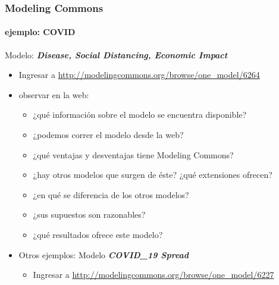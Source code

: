 \documentclass[11pt]{beamer}
\begin{document}
\begin{frame}
	\frametitle{Modeling Commons}
	\framesubtitle{ejemplo: COVID}
Modelo: \textit{\textbf{Disease, Social Distancing, Economic Impact }}
	\begin{itemize}
		\item Ingresar a \url{http://modelingcommons.org/browse/one_model/6264}
		\item observar en la web:
		\begin{itemize}
			\item ¿qué información sobre el modelo se encuentra disponible?
			\item ¿podemos correr el modelo desde la web?
			\item ¿qué ventajas y desventajas tiene Modeling Commons?
			\item ¿hay otros modelos que surgen de éste? ¿qué extensiones ofrecen?		
\item ¿en qué se diferencia de los otros modelos?
\item ¿sus supuestos son razonables?
\item ¿qué resultados ofrece este modelo?
		\end{itemize}
		\item Otros ejemplos: Modelo \textit{\textbf{COVID\_19 Spread}}
		\begin{itemize}
		\item Ingresar a \url{http://modelingcommons.org/browse/one_model/6227}
		\end{itemize}
	\end{itemize}
\end{frame}
\end{document}
